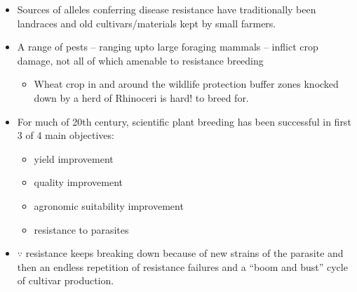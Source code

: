 \documentclass[11pt,dvipsnames,ignorenonframetext,aspectratio=169]{beamer}
\providecommand{\tightlist}{%
  \setlength{\itemsep}{0pt}\setlength{\parskip}{0pt}}
\begin{document}
\begin{frame}{}
\protect\hypertarget{section-6}{}
\small

\begin{itemize}
\tightlist
\item
  Sources of alleles conferring disease resistance have traditionally
  been landraces and old cultivars/materials kept by small farmers.
\item
  A range of pests -- ranging upto large foraging mammals -- inflict
  crop damage, not all of which amenable to resistance breeding

  \begin{itemize}
  \tightlist
  \item
    Wheat crop in and around the wildlife protection buffer zones
    knocked down by a herd of Rhinoceri is hard! to breed for.\\
  \end{itemize}
\item
  For much of 20th century, scientific plant breeding has been
  successful in first 3 of 4 main objectives:

  \begin{itemize}
  \tightlist
  \item
    yield improvement
  \item
    quality improvement
  \item
    agronomic suitability improvement
  \item
    resistance to parasites
  \end{itemize}
\item
  \(\because\) resistance keeps breaking down because of new strains of
  the parasite and then an endless repetition of resistance failures and
  a ``boom and bust'' cycle of cultivar production.
\end{itemize}
\end{frame}
\end{document}
